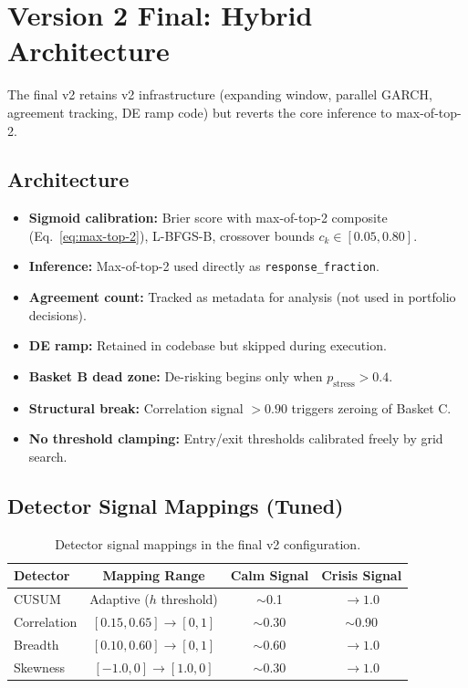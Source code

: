 \documentclass[11pt,a4paper]{article}
\begin{document}
\section{Version 2 Final: Hybrid Architecture}
\label{sec:v2-final}

The final v2 retains v2 infrastructure (expanding window, parallel GARCH, agreement tracking, DE ramp code) but reverts the core inference to max-of-top-2.

\subsection{Architecture}

\begin{itemize}[nosep]
  \item \textbf{Sigmoid calibration:} Brier score with max-of-top-2 composite (Eq.~\ref{eq:max-top-2}), L-BFGS-B, crossover bounds $c_k \in [0.05, 0.80]$.
  \item \textbf{Inference:} Max-of-top-2 used directly as \texttt{response\_fraction}.
  \item \textbf{Agreement count:} Tracked as metadata for analysis (not used in portfolio decisions).
  \item \textbf{DE ramp:} Retained in codebase but skipped during execution.
  \item \textbf{Basket B dead zone:} De-risking begins only when $p_{\mathrm{stress}} > 0.4$.
  \item \textbf{Structural break:} Correlation signal $> 0.90$ triggers zeroing of Basket C.
  \item \textbf{No threshold clamping:} Entry/exit thresholds calibrated freely by grid search.
\end{itemize}

\subsection{Detector Signal Mappings (Tuned)}

\begin{table}[h]
\centering
\begin{tabular}{lccc}
\toprule
\textbf{Detector} & \textbf{Mapping Range} & \textbf{Calm Signal} & \textbf{Crisis Signal} \\
\midrule
CUSUM & Adaptive ($h$ threshold) & $\sim$0.1 & $\to 1.0$ \\
Correlation & $[0.15, 0.65] \to [0, 1]$ & $\sim$0.30 & $\sim$0.90 \\
Breadth & $[0.10, 0.60] \to [0, 1]$ & $\sim$0.60 & $\to 1.0$ \\
Skewness & $[-1.0, 0] \to [1.0, 0]$ & $\sim$0.30 & $\to 1.0$ \\
\bottomrule
\end{tabular}
\caption{Detector signal mappings in the final v2 configuration.}
\label{tab:mappings}
\end{table}
\end{document}
